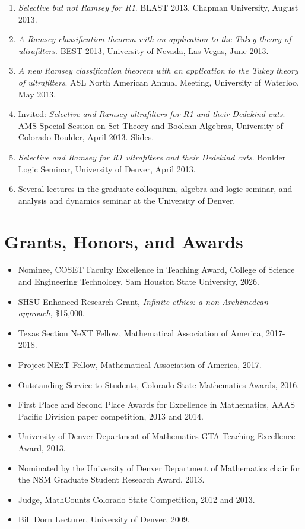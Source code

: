 \documentclass[10pt,letterpaper]{article}
\begin{document}
\begin{enumerate}
\item \emph{Selective but not Ramsey for R1}. BLAST 2013, Chapman University, August 2013.
\item \emph{A Ramsey classification theorem with an application to the Tukey theory of ultrafilters}. BEST 2013, University of Nevada, Las Vegas, June 2013.
\item \emph{A new Ramsey classification theorem with an application to the Tukey theory of ultrafilters}. ASL North American Annual Meeting, University of Waterloo, May 2013.
\item Invited: \emph{Selective and Ramsey ultrafilters for R1 and their Dedekind cuts}. AMS Special Session on Set Theory and Boolean Algebras, University of Colorado Boulder, April 2013. \href{https://trujillo1234.github.io/research/presentations/ams-selective-ramsey.pdf}{Slides}.
\item \emph{Selective and Ramsey for R1 ultrafilters and their Dedekind cuts}. Boulder Logic Seminar, University of Denver, April 2013.
\item Several lectures in the graduate colloquium, algebra and logic seminar, and analysis and dynamics seminar at the University of Denver.
\end{enumerate}
\section*{Grants, Honors, and Awards}
\begin{itemize}
\item Nominee, COSET Faculty Excellence in Teaching Award, College of Science and Engineering Technology, Sam Houston State University, 2026.
\item SHSU Enhanced Research Grant, \emph{Infinite ethics: a non-Archimedean approach}, \$15,000.
\item Texas Section NeXT Fellow, Mathematical Association of America, 2017-2018.
\item Project NExT Fellow, Mathematical Association of America, 2017.
\item Outstanding Service to Students, Colorado State Mathematics Awards, 2016.
\item First Place and Second Place Awards for Excellence in Mathematics, AAAS Pacific Division paper competition, 2013 and 2014.
\item University of Denver Department of Mathematics GTA Teaching Excellence Award, 2013.
\item Nominated by the University of Denver Department of Mathematics chair for the NSM Graduate Student Research Award, 2013.
\item Judge, MathCounts Colorado State Competition, 2012 and 2013.
\item Bill Dorn Lecturer, University of Denver, 2009.
\end{itemize}
\end{document}
